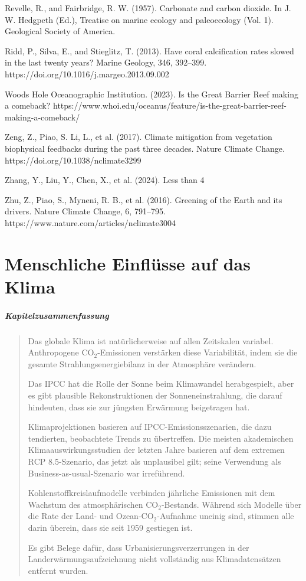 \documentclass[12pt,paper=a4,DIV=12,parskip=never,chapterprefix=false,headings=standardclasses]{scrreprt}
\numberwithin{figure}{chapter}
\begin{document}
Revelle, R., and Fairbridge, R. W. (1957). Carbonate and carbon dioxide. In J. W. Hedgpeth (Ed.), Treatise on marine ecology and paleoecology (Vol. 1). Geological Society of America.

Ridd, P., Silva, E., and Stieglitz, T. (2013). Have coral calcification rates slowed in the last twenty years? Marine Geology, 346, 392–399. https://doi.org/10.1016/j.margeo.2013.09.002

Woods Hole Oceanographic Institution. (2023). Is the Great Barrier Reef making a comeback? https://www.whoi.edu/oceanus/feature/is-the-great-barrier-reef-making-a-comeback/

Zeng, Z., Piao, S. Li, L., et al. (2017). Climate mitigation from vegetation biophysical feedbacks during the past three decades. Nature Climate Change. https://doi.org/10.1038/nclimate3299

Zhang, Y., Liu, Y., Chen, X., et al. (2024). Less than 4%

Zhu, Z., Piao, S., Myneni, R. B., et al. (2016). Greening of the Earth and its drivers. Nature Climate Change, 6, 791–795. https://www.nature.com/articles/nclimate3004

\chapter{Menschliche Einflüsse auf das Klima}
\paragraph{Kapitelzusammenfassung}
\begin{quote}
Das globale Klima ist natürlicherweise auf allen Zeitskalen variabel. Anthropogene CO$_2$-Emissionen verstärken diese Variabilität, indem sie die gesamte Strahlungsenergiebilanz in der Atmosphäre verändern.

Das IPCC hat die Rolle der Sonne beim Klimawandel herabgespielt, aber es gibt plausible Rekonstruktionen der Sonneneinstrahlung, die darauf hindeuten, dass sie zur jüngsten Erwärmung beigetragen hat.

Klimaprojektionen basieren auf IPCC-Emissionsszenarien, die dazu tendierten, beobachtete Trends zu übertreffen. Die meisten akademischen Klimaauswirkungsstudien der letzten Jahre basieren auf dem extremen RCP 8.5-Szenario, das jetzt als unplausibel gilt; seine Verwendung als Business-as-usual-Szenario war irreführend.

Kohlenstoffkreislaufmodelle verbinden jährliche Emissionen mit dem Wachstum des atmosphärischen CO$_2$-Bestands. Während sich Modelle über die Rate der Land- und Ozean-CO$_2$-Aufnahme uneinig sind, stimmen alle darin überein, dass sie seit 1959 gestiegen ist.

Es gibt Belege dafür, dass Urbanisierungsverzerrungen in der Landerwärmungsaufzeichnung nicht vollständig aus Klimadatensätzen entfernt wurden.
\end{quote}
\end{document}
